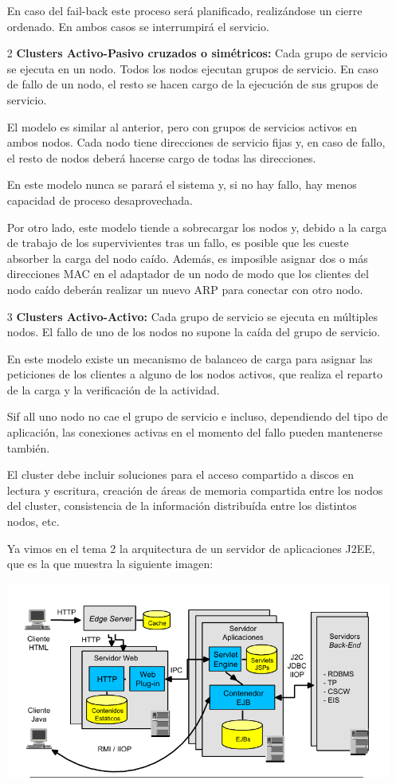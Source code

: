 \documentclass{apuntes}[nochap]
\begin{document}
\begin{enumerate}
En caso del fail-back este proceso será planificado, realizándose un cierre ordenado. En ambos casos se interrumpirá el servicio.

\item[2] \textbf{Clusters Activo-Pasivo cruzados o simétricos:} Cada grupo de servicio se ejecuta en un nodo. Todos los nodos ejecutan grupos de servicio. En caso de fallo de un nodo, el resto se hacen cargo de la ejecución de sus grupos de servicio.

El modelo es similar al anterior, pero con grupos de servicios activos en ambos nodos. Cada nodo tiene direcciones de servicio fijas y, en caso de fallo, el resto de nodos deberá hacerse cargo de todas las direcciones.

En este modelo nunca se parará el sistema y, si no hay fallo, hay menos capacidad de proceso desaprovechada.

Por otro lado, este modelo tiende a sobrecargar los nodos y, debido a la carga de trabajo de los supervivientes tras un fallo, es posible que les cueste absorber la carga del nodo caído. Además, es imposible asignar dos o más direcciones MAC en el adaptador de un nodo de modo que los clientes del nodo caído deberán realizar un nuevo ARP para conectar con otro nodo.


\item[3] \textbf{Clusters Activo-Activo:} Cada grupo de servicio se ejecuta en múltiples nodos. El fallo de uno de los nodos no supone la caída del grupo de servicio.

En este modelo existe un mecanismo de balanceo de carga para asignar las peticiones de los clientes a alguno de los nodos activos, que realiza el reparto de la carga y la verificación de la actividad.

Sif all uno nodo no cae el grupo de servicio e incluso, dependiendo del tipo de aplicación, las conexiones activas en el momento del fallo pueden mantenerse también.

El cluster debe incluir soluciones para el acceso compartido a discos en lectura y escritura, creación de áreas de memoria compartida entre los nodos del cluster, consistencia de la información distribuída entre los distintos nodos, etc.

\begin{example}
Ya vimos en el tema 2 la arquitectura de un servidor de aplicaciones J2EE, que es la que muestra la siguiente imagen:
\begin{center}
\includegraphics[width=\linewidth]{img/j2ee.png}
\end{center}


\end{example}
\end{enumerate}
\end{document}
